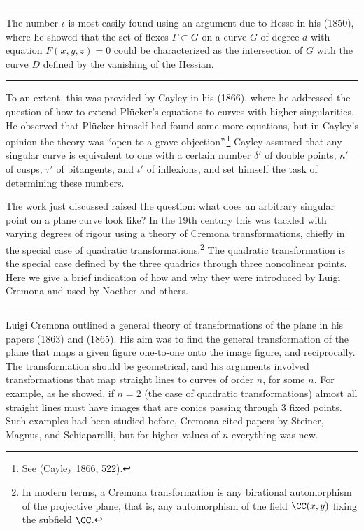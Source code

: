 \bigbreak\hrule\bigbreak


The number $\iota$ is most easily found using an argument due to Hesse in his (1850), where he showed that the set of flexes $\Gamma \subset G$ on a curve $G$ of degree $d$ with equation $F(x,y,z) = 0$ could be characterized as the intersection of $G$ with the curve $D$ defined by the vanishing of the Hessian.

\bigbreak\hrule\bigbreak

To an extent, this was provided by Cayley in his (1866), where he addressed the question of how to extend Pl\"ucker's equations to curves with higher singularities.  He observed that Pl\"ucker himself had found some more equations, but in Cayley's opinion the theory was ``open to a grave objection''.\footnote{See  (Cayley 1866,  522).} Cayley assumed that any singular curve is equivalent to one with a certain number $\delta'$ of double points, $\kappa'$ of cusps, $\tau'$ of bitangents, and $\iota'$ of inflexions, and set himself the task of determining these numbers. 

The work just discussed raised the question: what does an arbitrary singular point on a plane curve look like?  In the 19th century this was tackled with varying degrees of rigour using a theory of Cremona transformations, chiefly in the special case of quadratic transformations.\footnote{In modern terms, a Cremona transformation
is any birational automorphism of the projective plane, that is, any automorphism of the field $\CC(x,y)$ fixing the subfield $\CC$.}
The quadratic transformation is the special case defined by the three quadrics through three noncolinear points. Here we give a brief indication of how and why they were introduced by Luigi Cremona and used by Noether and others. 

\bigbreak\hrule\bigbreak


Luigi Cremona outlined a general theory of transformations of the plane in his papers (1863) and (1865). His aim was to find the general transformation of the plane that maps a given figure one-to-one onto the image figure, and reciprocally. The transformation should be geometrical, and his arguments involved transformations that map straight lines to curves of order $n$, for some $n.$  For example, as he showed, if $n=2$ (the case of quadratic transformations) almost all straight lines must have images that are conics passing through 3 fixed points. Such examples had been studied before, Cremona cited papers by Steiner, Magnus, and Schiaparelli, but for higher values of $n$ everything was new.


